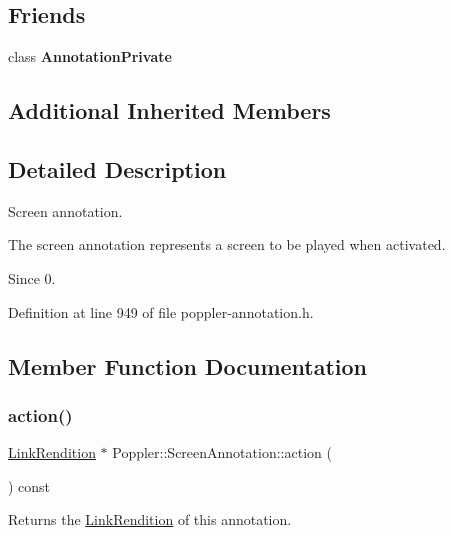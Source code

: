 \subsection*{Friends}
\begin{DoxyCompactItemize}
\item 
\mbox{\label{class_poppler_1_1_screen_annotation_add0bc3e32e560f9e9eb3025587c1ad54}} 
class {\bfseries Annotation\+Private}
\end{DoxyCompactItemize}
\subsection*{Additional Inherited Members}


\subsection{Detailed Description}
Screen annotation. 

The screen annotation represents a screen to be played when activated.

\begin{DoxySince}{Since}
0. 
\end{DoxySince}


Definition at line 949 of file poppler-\/annotation.\+h.



\subsection{Member Function Documentation}
\mbox{\label{class_poppler_1_1_screen_annotation_a01cae5bce049e1a6c3956ca53491832c}} 
\subsubsection{\texorpdfstring{action()}{action()}}
{\footnotesize\ttfamily \hyperlink{class_poppler_1_1_link_rendition}{Link\+Rendition} $\ast$ Poppler\+::\+Screen\+Annotation\+::action (\begin{DoxyParamCaption}{ }\end{DoxyParamCaption}) const}

Returns the \hyperlink{class_poppler_1_1_link_rendition}{Link\+Rendition} of this annotation. 

